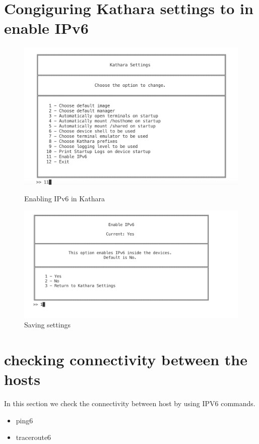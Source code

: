 \section{Congiguring Kathara settings to in enable IPv6}

\begin{figure}[H]
  \centering
  \begin{minipage}[b]{0.45\textwidth}
    \includegraphics[width=\textwidth]{images/KatharaSettings.png}
    \caption{Enabling IPv6 in Kathara}
  \end{minipage}
  \hfill
  \begin{minipage}[b]{0.45\textwidth}
    \includegraphics[width=\textwidth]{images/katharaSetiingConfir.png}
    \caption{Saving settings}
  \end{minipage}
\end{figure}

\section{checking connectivity between the hosts}
In this section we check the connectivity between host by using IPV6 commands.
\begin{itemize}
    \item ping6
    \item traceroute6
\end{itemize}

